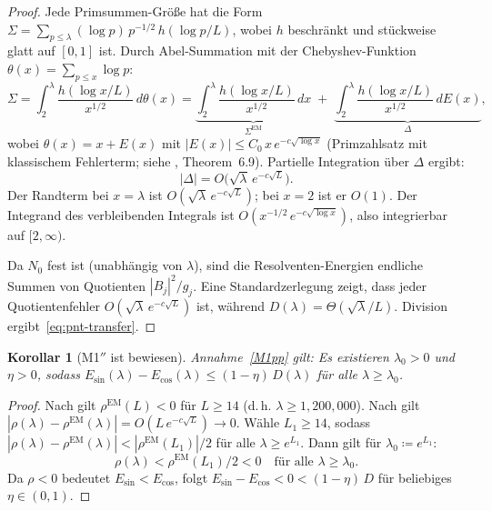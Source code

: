 \documentclass[12pt,a4paper]{article}
\newtheorem{corollary}[theorem]{Korollar}
\theoremstyle{definition}
\theoremstyle{remark}
\begin{document}
\begin{proof}
Jede Primsummen-Größe hat die Form $\Sigma = \sum_{p \leq \lambda} (\log p)\,p^{-1/2}\,h(\log p/L)$, wobei $h$ beschränkt und stückweise glatt auf $[0,1]$ ist. Durch Abel-Summation mit der Chebyshev-Funktion $\theta(x) = \sum_{p \leq x} \log p$:
\[
  \Sigma = \int_2^{\lambda} \frac{h(\log x/L)}{x^{1/2}}\,d\theta(x)
  = \underbrace{\int_2^{\lambda} \frac{h(\log x/L)}{x^{1/2}}\,dx}_{\displaystyle \Sigma^{\mathrm{EM}}}
  \;+\; \underbrace{\int_2^{\lambda} \frac{h(\log x/L)}{x^{1/2}}\,dE(x)}_{\displaystyle \Delta},
\]
wobei $\theta(x) = x + E(x)$ mit $|E(x)| \leq C_0\,x\,e^{-c\sqrt{\log x}}$ (Primzahlsatz mit klassischem Fehlerterm; siehe \cite{IwaniecKowalski2004}, Theorem~6.9). Partielle Integration über $\Delta$ ergibt:
\[
  |\Delta| = O\!\bigl(\sqrt{\lambda}\,e^{-c\sqrt{L}}\bigr).
\]
Der Randterm bei $x = \lambda$ ist $O(\sqrt{\lambda}\,e^{-c\sqrt{L}})$; bei $x = 2$ ist er $O(1)$. Der Integrand des verbleibenden Integrals ist $O(x^{-1/2}\,e^{-c\sqrt{\log x}})$, also integrierbar auf $[2,\infty)$.

Da $N_0$ fest ist (unabhängig von $\lambda$), sind die Resolventen-Energien endliche Summen von Quotienten $|B_j|^2/g_j$. Eine Standardzerlegung zeigt, dass jeder Quotientenfehler $O(\sqrt{\lambda}\,e^{-c\sqrt{L}})$ ist, während $D(\lambda) = \Theta(\sqrt{\lambda}/L)$. Division ergibt~\eqref{eq:pnt-transfer}.
\end{proof}

\begin{corollary}[M1$''$ ist bewiesen]
\label{cor:M1-proved}
Annahme~\ref{M1pp} gilt: Es existieren $\lambda_0 > 0$ und $\eta > 0$, sodass $E_{\sin}(\lambda) - E_{\cos}(\lambda) \leq (1-\eta)\,D(\lambda)$ für alle $\lambda \geq \lambda_0$.
\end{corollary}

\begin{proof}
Nach  gilt $\rho^{\mathrm{EM}}(L) < 0$ für $L \geq 14$ (d.\,h. $\lambda \geq 1{,}200{,}000$). Nach  gilt $|\rho(\lambda) - \rho^{\mathrm{EM}}(\lambda)| = O(L\,e^{-c\sqrt{L}}) \to 0$. Wähle $L_1 \geq 14$, sodass $|\rho(\lambda) - \rho^{\mathrm{EM}}(\lambda)| < |\rho^{\mathrm{EM}}(L_1)|/2$ für alle $\lambda \geq e^{L_1}$. Dann gilt für $\lambda_0 \coloneqq e^{L_1}$:
\[
  \rho(\lambda) < \rho^{\mathrm{EM}}(L_1)/2 < 0 \quad\text{für alle } \lambda \geq \lambda_0.
\]
Da $\rho < 0$ bedeutet $E_{\sin} < E_{\cos}$, folgt $E_{\sin} - E_{\cos} < 0 < (1-\eta)\,D$ für beliebiges $\eta \in (0,1)$.
\end{proof}
\end{document}
